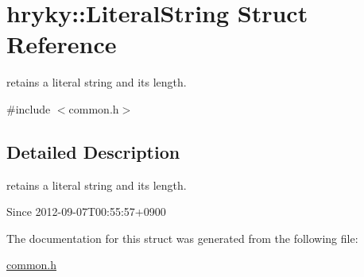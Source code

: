 \hypertarget{structhryky_1_1_literal_string}{\section{hryky\-:\-:Literal\-String Struct Reference}
\label{structhryky_1_1_literal_string}
}


retains a literal string and its length.  




{\ttfamily \#include $<$common.\-h$>$}



\subsection{Detailed Description}
retains a literal string and its length. 

\begin{DoxySince}{Since}
2012-\/09-\/07\-T00\-:55\-:57+0900 
\end{DoxySince}


The documentation for this struct was generated from the following file\-:\begin{DoxyCompactItemize}
\item 
\hyperlink{common_8h}{common.\-h}\end{DoxyCompactItemize}
